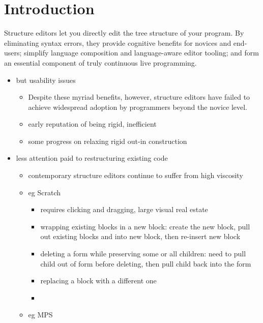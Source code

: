 \section{Introduction}\label{sec:intro}

Structure editors let you directly edit the tree structure of your program.
By eliminating syntax errors, they
  provide cognitive benefits for novices and end-users;
  simplify language composition and language-aware editor tooling;
  and form an essential component of truly continuous live programming.

\begin{itemize}
\item but usability issues
\begin{itemize}
    \item Despite these myriad benefits, however, structure editors have failed to achieve
      widespread adoption by programmers beyond the novice level.
    \item early reputation of being rigid, inefficient
    \item some progress on relaxing rigid out-in construction
\end{itemize}
\item less attention paid to restructuring existing code
\begin{itemize}
  \item contemporary structure editors continue to suffer from high viscosity
  \item eg Scratch
  \begin{itemize}
    \item requires clicking and dragging, large visual real estate
    \item wrapping existing blocks in a new block:
      create the new block,
      pull out existing blocks and into new block,
      then re-insert new block
    \item deleting a form while preserving some or all children:
      need to pull child out of form before deleting,
      then pull child back into the form
    \item replacing a block with a different one
    \item {}
  \end{itemize}
  \item eg MPS

\end{itemize}
\end{itemize}
